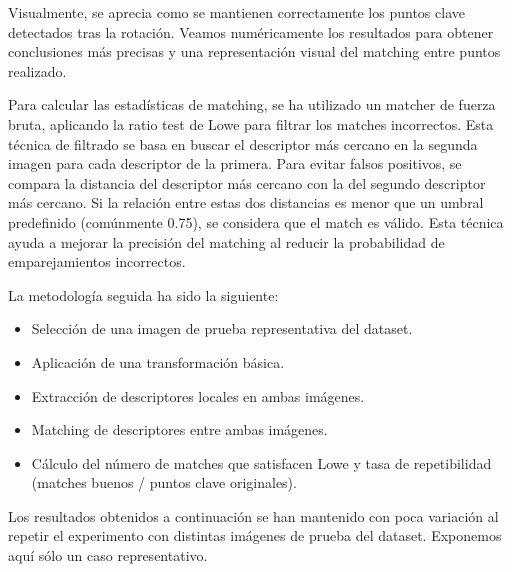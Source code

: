 \documentclass[11pt,a4paper]{article}
\begin{document}
Visualmente, se aprecia como se mantienen correctamente los puntos 
clave detectados tras la rotación. Veamos numéricamente los resultados
para obtener conclusiones más precisas y una representación 
visual del matching entre puntos realizado. 
 
Para calcular las estadísticas de matching, se ha utilizado un 
matcher de fuerza bruta, aplicando la ratio test de Lowe\cite{lowe} para 
filtrar los matches incorrectos. Esta técnica de filtrado se basa 
en buscar el descriptor más cercano en la segunda imagen para cada 
descriptor de la primera. Para evitar falsos positivos, se compara la 
distancia del descriptor más cercano con la del segundo descriptor 
más cercano. Si la relación entre estas dos distancias es menor que 
un umbral predefinido (comúnmente 0.75), se considera que el match es 
válido. Esta técnica ayuda a mejorar la precisión del matching al 
reducir la probabilidad de emparejamientos incorrectos.

La metodología seguida ha sido la siguiente:
\begin{itemize}
    \item Selección de una imagen de prueba representativa del dataset.
    \item Aplicación de una transformación básica.
    \item Extracción de descriptores locales en ambas imágenes.
    \item Matching de descriptores entre ambas imágenes.
    \item Cálculo del número de matches que satisfacen Lowe y tasa de repetibilidad (matches buenos / puntos clave originales).
\end{itemize}

Los resultados obtenidos a continuación se han mantenido con poca variación
al repetir el experimento con distintas imágenes de prueba del dataset. Exponemos
aquí sólo un caso representativo.
\end{document}

